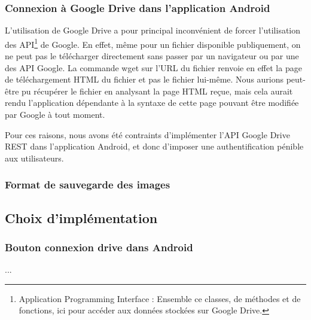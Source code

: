 \subsubsection{Connexion à Google Drive dans l'application Android}
\par
L'utilisation de Google Drive a pour principal inconvénient de forcer l'utilisation des API\footnote{Application Programming Interface : Ensemble ce classes, de méthodes et de fonctions, ici pour accéder aux données stockées sur Google Drive.} de Google. En effet, même pour un fichier disponible publiquement, on ne peut pas le télécharger directement sans passer par un navigateur ou par une des API Google. La commande wget sur l'URL du fichier renvoie en effet la page de téléchargement HTML du fichier et pas le fichier lui-même. Nous aurions peut-être pu récupérer le fichier en analysant la page HTML reçue, mais cela aurait rendu l'application dépendante à la syntaxe de cette page pouvant être modifiée par Google à tout moment.
\par
Pour ces raisons, nous avons été contraints d'implémenter l'API Google Drive REST dans l'application Android, et donc d'imposer une authentification pénible aux utilisateurs.

\subsubsection{Format de sauvegarde des images}




\subsection{Choix d'implémentation}

\subsubsection{Bouton connexion drive dans Android}


 ...\\